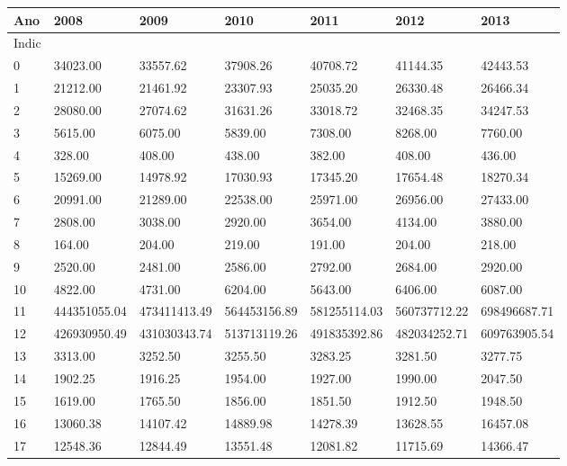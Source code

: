 \documentclass{report}
\begin{document}
\begin{tabular}{lllllll}
\toprule
Ano &          2008 &          2009 &          2010 &          2011 &          2012 &          2013 \\
\midrule
Indic &               &               &               &               &               &               \\
0         &  34023.00 &  33557.62 &  37908.26 &  40708.72 &  41144.35 &  42443.53 \\
1         &  21212.00 &  21461.92 &  23307.93 &  25035.20 &  26330.48 &  26466.34 \\
2         &  28080.00 &  27074.62 &  31631.26 &  33018.72 &  32468.35 &  34247.53 \\
3         &  5615.00 &  6075.00 &  5839.00 &  7308.00 &  8268.00 &  7760.00 \\
4         &  328.00 &  408.00 &  438.00 &  382.00 &  408.00 &  436.00 \\
5         &  15269.00 &  14978.92 &  17030.93 &  17345.20 &  17654.48 &  18270.34 \\
6         &  20991.00 &  21289.00 &  22538.00 &  25971.00 &  26956.00 &  27433.00 \\
7         &  2808.00 &  3038.00 &  2920.00 &  3654.00 &  4134.00 &  3880.00 \\
8         &  164.00 &  204.00 &  219.00 &  191.00 &  204.00 &  218.00 \\
9         &  2520.00 &  2481.00 &  2586.00 &  2792.00 &  2684.00 &  2920.00 \\
10        &  4822.00 &  4731.00 &  6204.00 &  5643.00 &  6406.00 &  6087.00 \\
11        &  444351055.04 &  473411413.49 &  564453156.89 &  581255114.03 &  560737712.22 &  698496687.71 \\
12        &  426930950.49 &  431030343.74 &  513713119.26 &  491835392.86 &  482034252.71 &  609763905.54 \\
13        &  3313.00 &  3252.50 &  3255.50 &  3283.25 &  3281.50 &  3277.75 \\
14        &  1902.25 &  1916.25 &  1954.00 &  1927.00 &  1990.00 &  2047.50 \\
15        &  1619.00 &  1765.50 &  1856.00 &  1851.50 &  1912.50 &  1948.50 \\
16        &  13060.38 &  14107.42 &  14889.98 &  14278.39 &  13628.55 &  16457.08 \\
17        &  12548.36 &  12844.49 &  13551.48 &  12081.82 &  11715.69 &  14366.47 \\

\end{tabular}
\end{document}
